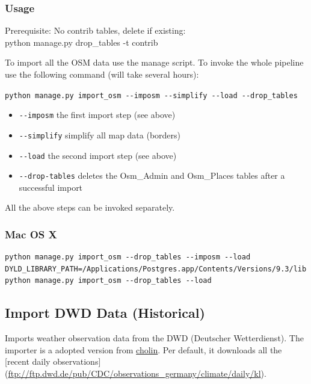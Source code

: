 \documentclass[paper=a4, fontsize=11pt]{scrartcl} %
\numberwithin{equation}{section} %
\numberwithin{figure}{section} %
\numberwithin{table}{section} %
\begin{document}
\subsubsection*{Usage}\label{usage}

Prerequisite: No contrib tables, delete if existing:\\ python manage.py
drop\_tables -t contrib

To import all the OSM data use the manage script. To invoke the whole
pipeline use the following command (will take several hours):

\texttt{python\ manage.py\ import\_osm\ -\/-imposm\ -\/-simplify\ -\/-load\ -\/-drop\_tables}

\begin{itemize}
\itemsep1pt\parskip0pt
\item
  \texttt{-\/-imposm} the first import step (see above)
\item
  \texttt{-\/-simplify} simplify all map data (borders)
\item
  \texttt{-\/-load} the second import step (see above)
\item
  \texttt{-\/-drop-tables} deletes the Osm\_Admin and Osm\_Places tables
  after a successful import
\end{itemize}

All the above steps can be invoked separately.

\subsubsection*{Mac OS X}\label{mac-os-x}

\begin{lstlisting}[breaklines=true]
python manage.py import_osm --drop_tables --imposm --load
DYLD_LIBRARY_PATH=/Applications/Postgres.app/Contents/Versions/9.3/lib python manage.py import_osm --drop_tables --load
\end{lstlisting}

\subsection{Import DWD Data (Historical)}\label{import-dwd-data}

Imports weather observation data from the DWD (Deutscher Wetterdienst).
The importer is a adopted version
from \href{https://github.com/cholin/fuberlin_spatial_db_project}{cholin}.
Per default, it downloads all the {[}recent daily
observations{]}\\(\url{ftp://ftp.dwd.de/pub/CDC/observations_germany/climate/daily/kl}).
\end{document}
